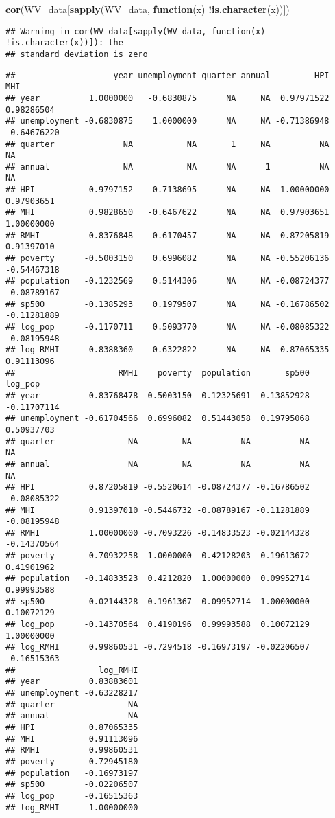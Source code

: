 \documentclass[
]{article}
\newenvironment{Shaded}{\begin{snugshade}}{\end{snugshade}}
\newcommand{\ControlFlowTok}[1]{\textcolor[rgb]{0.13,0.29,0.53}{\textbf{#1}}}
\newcommand{\KeywordTok}[1]{\textcolor[rgb]{0.13,0.29,0.53}{\textbf{#1}}}
\newcommand{\NormalTok}[1]{#1}
\newcommand{\OperatorTok}[1]{\textcolor[rgb]{0.81,0.36,0.00}{\textbf{#1}}}
\begin{document}
\begin{Shaded}
\begin{Highlighting}[]
\KeywordTok{cor}\NormalTok{(WV_data[}\KeywordTok{sapply}\NormalTok{(WV_data, }\ControlFlowTok{function}\NormalTok{(x) }\OperatorTok{!}\KeywordTok{is.character}\NormalTok{(x))])}
\end{Highlighting}
\end{Shaded}

\begin{verbatim}
## Warning in cor(WV_data[sapply(WV_data, function(x) !is.character(x))]): the
## standard deviation is zero
\end{verbatim}

\begin{verbatim}
##                    year unemployment quarter annual         HPI         MHI
## year          1.0000000   -0.6830875      NA     NA  0.97971522  0.98286504
## unemployment -0.6830875    1.0000000      NA     NA -0.71386948 -0.64676220
## quarter              NA           NA       1     NA          NA          NA
## annual               NA           NA      NA      1          NA          NA
## HPI           0.9797152   -0.7138695      NA     NA  1.00000000  0.97903651
## MHI           0.9828650   -0.6467622      NA     NA  0.97903651  1.00000000
## RMHI          0.8376848   -0.6170457      NA     NA  0.87205819  0.91397010
## poverty      -0.5003150    0.6996082      NA     NA -0.55206136 -0.54467318
## population   -0.1232569    0.5144306      NA     NA -0.08724377 -0.08789167
## sp500        -0.1385293    0.1979507      NA     NA -0.16786502 -0.11281889
## log_pop      -0.1170711    0.5093770      NA     NA -0.08085322 -0.08195948
## log_RMHI      0.8388360   -0.6322822      NA     NA  0.87065335  0.91113096
##                     RMHI    poverty  population       sp500     log_pop
## year          0.83768478 -0.5003150 -0.12325691 -0.13852928 -0.11707114
## unemployment -0.61704566  0.6996082  0.51443058  0.19795068  0.50937703
## quarter               NA         NA          NA          NA          NA
## annual                NA         NA          NA          NA          NA
## HPI           0.87205819 -0.5520614 -0.08724377 -0.16786502 -0.08085322
## MHI           0.91397010 -0.5446732 -0.08789167 -0.11281889 -0.08195948
## RMHI          1.00000000 -0.7093226 -0.14833523 -0.02144328 -0.14370564
## poverty      -0.70932258  1.0000000  0.42128203  0.19613672  0.41901962
## population   -0.14833523  0.4212820  1.00000000  0.09952714  0.99993588
## sp500        -0.02144328  0.1961367  0.09952714  1.00000000  0.10072129
## log_pop      -0.14370564  0.4190196  0.99993588  0.10072129  1.00000000
## log_RMHI      0.99860531 -0.7294518 -0.16973197 -0.02206507 -0.16515363
##                 log_RMHI
## year          0.83883601
## unemployment -0.63228217
## quarter               NA
## annual                NA
## HPI           0.87065335
## MHI           0.91113096
## RMHI          0.99860531
## poverty      -0.72945180
## population   -0.16973197
## sp500        -0.02206507
## log_pop      -0.16515363
## log_RMHI      1.00000000
\end{verbatim}
\end{document}
